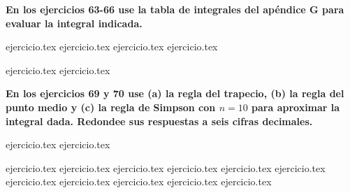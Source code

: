 \vspace{0.5cm}
\noindent\textbf{En los ejercicios 63-66 use la tabla de integrales del apéndice G para evaluar la integral indicada.}
\begin{enumerate}
    \setcounter{enumi}{62}
    {ejercicio.tex}
{ejercicio.tex}
{ejercicio.tex}
{ejercicio.tex}
\end{enumerate}

\vspace{0.5cm}
\begin{enumerate}
    \setcounter{enumi}{66}
    {ejercicio.tex}
{ejercicio.tex}
\end{enumerate}

\vspace{0.5cm}
\noindent\textbf{En los ejercicios 69 y 70 use (a) la regla del trapecio, (b) la regla del punto medio y (c) la regla de Simpson con $n = 10$ para aproximar la integral dada. Redondee sus respuestas a seis cifras decimales.}
\begin{enumerate}
    \setcounter{enumi}{68}
    {ejercicio.tex}
{ejercicio.tex}
\end{enumerate}

\vspace{0.5cm}
\begin{enumerate}
    \setcounter{enumi}{70}
    {ejercicio.tex}
{ejercicio.tex}
{ejercicio.tex}
{ejercicio.tex}
{ejercicio.tex}
{ejercicio.tex}
{ejercicio.tex}
{ejercicio.tex}
{ejercicio.tex}
{ejercicio.tex}
{ejercicio.tex}
\end{enumerate}
